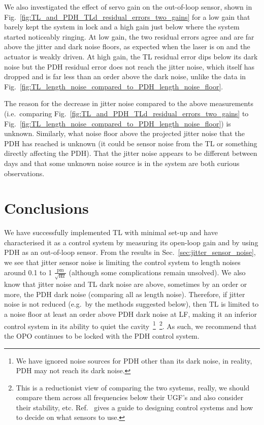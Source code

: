 \documentclass[aps,pra,superscriptaddress,reprint,nofootinbib]{revtex4-1}
\begin{document}
We also investigated the effect of servo gain on the out-of-loop sensor, shown in Fig.~\ref{fig:TL_and_PDH_TLd_residual_errors_two_gains} for a low gain that barely kept the system in lock and a high gain just below where the system started noticeably ringing. At low gain, the two residual errors agree and are far above the jitter and dark noise floors, as expected when the laser is on and the actuator is weakly driven. At high gain, the TL residual error dips below its dark noise but the PDH residual error does not reach the jitter noise, which itself has dropped and is far less than an order above the dark noise, unlike the data in Fig.~\ref{fig:TL_length_noise_compared_to_PDH_length_noise_floor}.

The reason for the decrease in jitter noise compared to the above measurements (i.e.\ comparing Fig.~\ref{fig:TL_and_PDH_TLd_residual_errors_two_gains} to Fig.~\ref{fig:TL_length_noise_compared_to_PDH_length_noise_floor}) is unknown. Similarly, what noise floor above the projected jitter noise that the PDH has reached is unknown (it could be sensor noise from the TL or something directly affecting the PDH). That the jitter noise appears to be different between days and that some unknown noise source is in the system are both curious observations.


\section{Conclusions}
\label{sec:conclusions}

We have successfully implemented TL with minimal set-up and have characterised it as a control system by measuring its open-loop gain and by using PDH as an out-of-loop sensor. From the results in Sec.~\ref{sec:jitter_sensor_noise}, we see that jitter sensor noise is limiting the control system to length noises around 0.1 to 1 $\frac{\mathrm{pm}}{\sqrt{\mathrm{Hz}}}$ (although some complications remain unsolved). We also know that jitter noise and TL dark noise are above, sometimes by an order or more, the PDH dark noise (comparing all as length noise).
Therefore, if jitter noise is not reduced (e.g.\ by the methods suggested below), then TL is limited to a noise floor at least an order above PDH dark noise at LF, making it an inferior control system in its ability to quiet the cavity~\footnote{We have ignored noise sources for PDH other than its dark noise, in reality, PDH may not reach its dark noise.}~\footnote{This is a reductionist view of comparing the two systems, really, we should compare them across all frequencies below their UGF’s and also consider their stability, etc. Ref.~\cite{FCS:2000} gives a guide to designing control systems and how to decide on what sensors to use.}. As such, we recommend that the OPO continues to be locked with the PDH control system.
\end{document}
